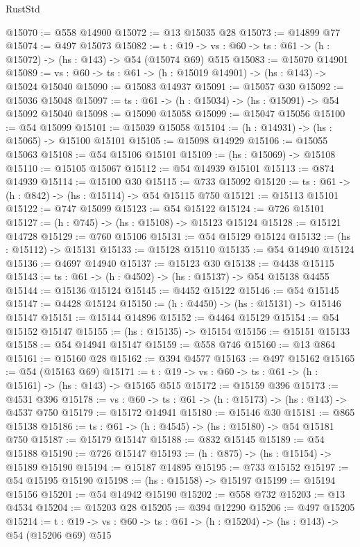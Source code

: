 \begin{lexlean}{RustStd}
\begin{coremodule}
@15070 := @558 @14900
@15072 := @13 @15035 @28
@15073 := @14899 @77
@15074 := @497 @15073
@15082 := {t : @19} ->
  {vs : @60} -> {ts : @61} -> (h : @15072) -> (hs : @143) -> @54 (@15074 @69) @515
@15083 := @15070 @14901
@15089 := {vs : @60} -> {ts : @61} -> (h : @15019 @14901) -> (hs : @143) -> @15024 @15040
@15090 := @15083 @14937
@15091 := @15057 @30
@15092 := @15036 @15048
@15097 := {ts : @61} -> (h : @15034) -> (hs : @15091) -> @54 @15092 @15040
@15098 := @15090 @15058
@15099 := @15047 @15056
@15100 := @54 @15099
@15101 := @15039 @15058
@15104 := (h : @14931) -> (hs : @15065) -> @15100 @15101
@15105 := @15098 @14929
@15106 := @15055 @15063
@15108 := @54 @15106 @15101
@15109 := (hs : @15069) -> @15108
@15110 := @15105 @15067
@15112 := @54 @14939 @15101
@15113 := @874 @14939
@15114 := @15100 @30
@15115 := @733 @15092
@15120 := {ts : @61} -> (h : @842) -> (hs : @15114) -> @54 @15115 @750
@15121 := @15113 @15101
@15122 := @747 @15099
@15123 := @54 @15122
@15124 := @726 @15101
@15127 := (h : @745) -> (hs : @15108) -> @15123 @15124
@15128 := @15121 @14728
@15129 := @760 @15106
@15131 := @54 @15129 @15124
@15132 := (hs : @15112) -> @15131
@15133 := @15128 @15110
@15135 := @54 @14940 @15124
@15136 := @4697 @14940
@15137 := @15123 @30
@15138 := @4438 @15115
@15143 := {ts : @61} -> (h : @4502) -> (hs : @15137) -> @54 @15138 @4455
@15144 := @15136 @15124
@15145 := @4452 @15122
@15146 := @54 @15145
@15147 := @4428 @15124
@15150 := (h : @4450) -> (hs : @15131) -> @15146 @15147
@15151 := @15144 @14896
@15152 := @4464 @15129
@15154 := @54 @15152 @15147
@15155 := (hs : @15135) -> @15154
@15156 := @15151 @15133
@15158 := @54 @14941 @15147
@15159 := @558 @746
@15160 := @13 @864
@15161 := @15160 @28
@15162 := @394 @4577
@15163 := @497 @15162
@15165 := @54 (@15163 @69)
@15171 := {t : @19} -> {vs : @60} -> {ts : @61} -> (h : @15161) -> (hs : @143) -> @15165 @515
@15172 := @15159 @396
@15173 := @4531 @396
@15178 := {vs : @60} -> {ts : @61} -> (h : @15173) -> (hs : @143) -> @4537 @750
@15179 := @15172 @14941
@15180 := @15146 @30
@15181 := @865 @15138
@15186 := {ts : @61} -> (h : @4545) -> (hs : @15180) -> @54 @15181 @750
@15187 := @15179 @15147
@15188 := @832 @15145
@15189 := @54 @15188
@15190 := @726 @15147
@15193 := (h : @875) -> (hs : @15154) -> @15189 @15190
@15194 := @15187 @14895
@15195 := @733 @15152
@15197 := @54 @15195 @15190
@15198 := (hs : @15158) -> @15197
@15199 := @15194 @15156
@15201 := @54 @14942 @15190
@15202 := @558 @732
@15203 := @13 @4534
@15204 := @15203 @28
@15205 := @394 @12290
@15206 := @497 @15205
@15214 := {t : @19} ->
  {vs : @60} -> {ts : @61} -> (h : @15204) -> (hs : @143) -> @54 (@15206 @69) @515

\end{coremodule}
\end{lexlean}
